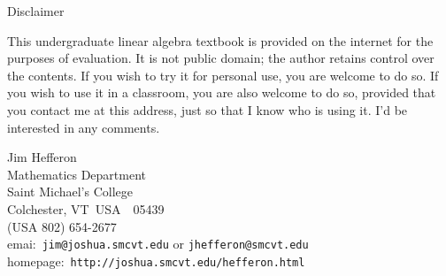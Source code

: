 \thispagestyle{empty}
\begin{center}
  Disclaimer
\end{center}

\noindent
This undergraduate linear algebra textbook is provided on the internet 
for the purposes of evaluation.
It is not public domain;
the author retains control over the contents.
If you wish to try it for personal use, you are welcome to do so. 
If you wish to use it in a classroom, 
you are also welcome to do so, provided that you contact me at this address,
just so that I know who is using it.
I'd be interested in any comments.

\begin{flushleft}
Jim Hef{}feron \\
Mathematics Department \\
Saint Michael's College \\
Colchester, VT\ USA\ \ 05439 \\
(USA 802) 654-2677  \\
emai:~\texttt{jim@joshua.smcvt.edu} or \texttt{jhefferon@smcvt.edu} \\
homepage:~\texttt{http://joshua.smcvt.edu/hefferon.html}
\end{flushleft}

\endinput